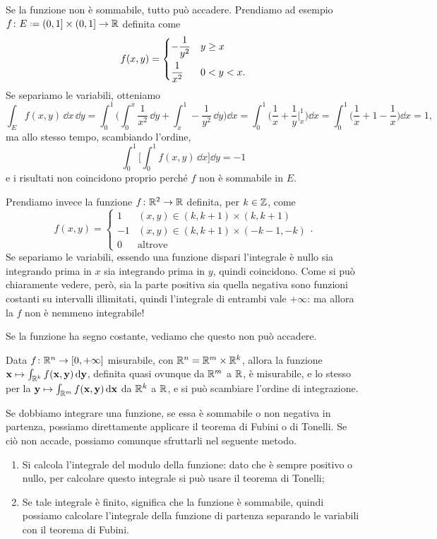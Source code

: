 Se la funzione non è sommabile, tutto può accadere.
Prendiamo ad esempio $f\colon E\defeq(0,1]\times(0,1]\to\R$ definita come
\begin{equation*}
	f(x,y)=
	\begin{dcases}
		-\frac1{y^2} &y\geq x\\
		\frac1{x^2} &0<y<x.
	\end{dcases}
\end{equation*}
Se separiamo le variabili, otteniamo
\begin{equation}
	\int_Ef(x,y)\,\dd x\,\dd y=\int_0^1\bigg(\int_0^x\frac1{x^2}\,\dd y+\int_x^1-\frac1{y^2}\,\dd y\bigg)\dd x=\int_0^1\bigg(\frac1{x}+\frac1{y}\bigg|_x^1\bigg)\dd x=\int_0^1\bigg(\frac1{x}+1-\frac1{x}\bigg)\dd x=1,
\end{equation}
ma allo stesso tempo, scambiando l'ordine,
\begin{equation}
	\int_0^1\bigg[\int_0^1f(x,y)\,\dd x\bigg]\dd y=-1
\end{equation}
e i risultati non coincidono proprio perch\'e $f$ non è sommabile in $E$.

Prendiamo invece la funzione $f\colon\mathbb{R}^2\to\mathbb{R}$ definita, per $k\in\mathbb{Z}$, come
\begin{equation*}
	f(x,y)=
	\begin{cases}
		1 &(x,y)\in(k,k+1)\times(k,k+1)\\
		-1 &(x,y)\in(k,k+1)\times(-k-1,-k)\\
		0 &\text{altrove}
	\end{cases}.
\end{equation*}
Se separiamo le variabili, essendo una funzione dispari l'integrale è nullo sia integrando prima in $x$ sia integrando prima in $y$, quindi coincidono.
Come si può chiaramente vedere, però, sia la parte positiva sia quella negativa sono funzioni costanti su intervalli illimitati, quindi l'integrale di entrambi vale $+\infty$: ma allora la $f$ non è nemmeno integrabile!

Se la funzione ha segno costante, vediamo che questo non può accadere.
\begin{teorema}[di Tonelli] \label{t:tonelli}
	Data $f\colon\mathbb{R}^n\to[0,+\infty]$ misurabile, con $\mathbb{R}^n=\mathbb{R}^m\times\mathbb{R}^k$, allora la funzione $\mathbf{x}\mapsto\int_{\mathbb{R}^k}f(\mathbf{x},\mathbf{y})\,\textup{d}\mathbf{y}$, definita quasi ovunque da $\mathbb{R}^m$ a $\mathbb{R}$, è misurabile, e lo stesso per la $\mathbf{y}\mapsto\int_{\mathbb{R}^m}f(\mathbf{x},\mathbf{y})\,\textup{d}\mathbf{x}$ da $\mathbb{R}^k$ a $\mathbb{R}$, e si può scambiare l'ordine di integrazione.
\end{teorema}
Se dobbiamo integrare una funzione, se essa è sommabile o non negativa in partenza, possiamo direttamente applicare il teorema di Fubini o di Tonelli.
Se ciò non accade, possiamo comunque sfruttarli nel seguente metodo.
\begin{enumerate}
	\item Si calcola l'integrale del modulo della funzione: dato che è sempre positivo o nullo, per calcolare questo integrale si può usare il teorema di Tonelli;
	\item Se tale integrale è finito, significa che la funzione è sommabile, quindi possiamo calcolare l'integrale della funzione di partenza separando le variabili con il teorema di Fubini.
\end{enumerate}

